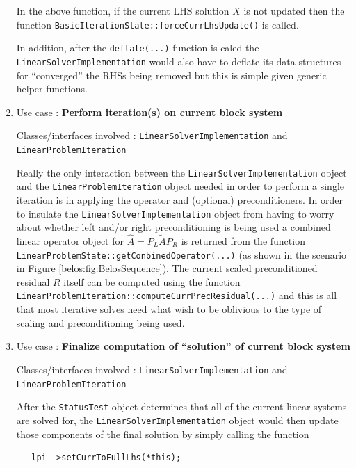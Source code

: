 \documentclass[pdf,ps2pdf,11pt]{SANDreport}
\begin{document}
\begin{enumerate}
In the above function, if the current LHS solution $\bar{X}$ is not
updated then the function
{}\texttt{Basic\-Iteration\-State\-::force\-Curr\-Lhs\-Update()} is
called.

In addition, after the {}\texttt{deflate(...)} function is caled the
{}\texttt{Linear\-Solver\-Implementation} would also have to deflate
its data structures for ``converged'' the RHSs being removed but this
is simple given generic helper functions.

{}\item Use case : \textbf{Perform iteration(s) on current block
system}

{}\noindent{}Classes/interfaces involved :
{}\texttt{Linear\-Solver\-Implementation} and
{}\texttt{Linear\-Problem\-Iteration}

Really the only interaction between the
{}\texttt{Linear\-Solver\-Implementation} object and the
{}\texttt{Linear\-Problem\-Iteration} object needed in order to
perform a single iteration is in applying the operator and (optional)
preconditioners.  In order to insulate the
{}\texttt{Linear\-Solver\-Implementation} object from having to worry
about whether left and/or right preconditioning is being used a
combined linear operator object for $\hat{A} = P_L \tilde{A} P_R$ is
returned from the function
{}\texttt{Linear\-Problem\-State::\-get\-Conbined\-Operator(...)} (as
shown in the scenario in Figure {}\ref{belos:fig:BelosSequence}).  The
current scaled preconditioned residual $\breve{R}$ itself can be
computed using the function
{}\texttt{Linear\-Problem\-Iteration::\-compute\-Curr\-Prec\-Residual(...)} 
and this is all that most iterative solves need what wish to be
oblivious to the type of scaling and preconditioning being used.

{}\item Use case : \textbf{Finalize computation of ``solution'' of
current block system}

{}\noindent{}Classes/interfaces involved :
{}\texttt{Linear\-Solver\-Implementation} and
{}\texttt{Linear\-Problem\-Iteration}

After the {}\texttt{Status\-Test} object determines that all of the
current linear systems are solved for, the
{}\texttt{Linear\-Solver\-Implementation} object would then update
those components of the final solution by simply calling the function

{\scriptsize\begin{verbatim}
   lpi_->setCurrToFullLhs(*this);
\end{verbatim}}


\end{enumerate}
\end{document}
